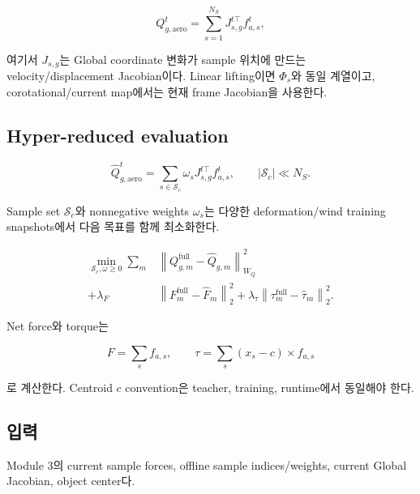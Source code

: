 \documentclass[11pt,a4paper]{article}
\begin{document}
\begin{equation}
  Q_{g,\mathrm{aero}}^t
  =
  \sum_{s=1}^{N_S}
  J_{s,g}^{t\top} f_{a,s}^t,
  \label{eq:full-generalized-aero}
\end{equation}

여기서 \(J_{s,g}\)는 Global coordinate 변화가 sample 위치에 만드는 velocity/displacement Jacobian이다.
Linear lifting이면 \(\Phi_s\)와 동일 계열이고,
corotational/current map에서는 현재 frame Jacobian을 사용한다.

\subsection*{Hyper-reduced evaluation}

\begin{equation}
  \widehat Q_{g,\mathrm{aero}}^t
  =
  \sum_{s\in\mathcal S_c}
  \omega_s
  J_{s,g}^{t\top} f_{a,s}^t,
  \qquad
  |\mathcal S_c|\ll N_S.
  \label{eq:hyper-aero}
\end{equation}

Sample set \(\mathcal S_c\)와 nonnegative weights \(\omega_s\)는
다양한 deformation/wind training snapshots에서 다음 목표를 함께 최소화한다.

\begin{equation}
\begin{aligned}
  \min_{\mathcal S_c,\omega\ge0}
  \sum_m
  &\left\|
  Q_{g,m}^{\mathrm{full}}
  -\widehat Q_{g,m}
  \right\|_{W_Q}^2\\
  +\lambda_F&
  \left\|
  F_m^{\mathrm{full}}
  -\widehat F_m
  \right\|_2^2
  +\lambda_\tau
  \left\|
  \tau_m^{\mathrm{full}}
  -\widehat\tau_m
  \right\|_2^2.
  \label{eq:cubature-fit}
\end{aligned}
\end{equation}

Net force와 torque는

\begin{equation}
  F=\sum_s f_{a,s},
  \qquad
  \tau=\sum_s(x_s-c)\times f_{a,s}
\end{equation}

로 계산한다.
Centroid \(c\) convention은 teacher, training, runtime에서 동일해야 한다.

\subsection*{입력}

Module 3의 current sample forces,
offline sample indices/weights,
current Global Jacobian, object center다.
\end{document}
